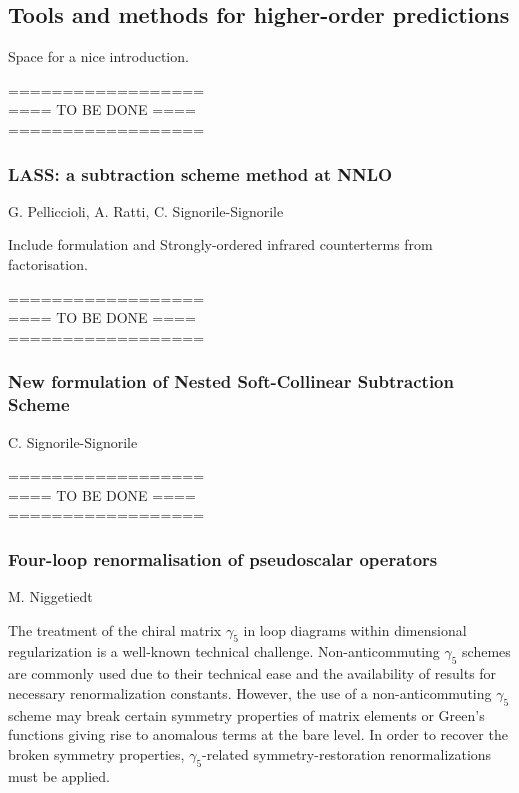 \documentclass{FBR_Bericht_2025}
\begin{document}
\subsection{Tools and methods for higher-order predictions}
\begin{refsection}
Space for a nice introduction.

%
{\color{red} ==================\\ ====\; TO BE DONE\; ====\\ ==================}
%
\subsubsection{LASS: a subtraction scheme method at NNLO}
\begin{Namen}
G. Pelliccioli, A. Ratti, C. Signorile-Signorile
\end{Namen}
Include formulation and Strongly-ordered infrared counterterms from factorisation.

%
{\color{red} ==================\\ ====\; TO BE DONE\; ====\\ ==================}
%
\subsubsection{New formulation of Nested Soft-Collinear Subtraction Scheme}
\begin{Namen}
C. Signorile-Signorile
\end{Namen}
%
{\color{red} ==================\\ ====\; TO BE DONE\; ====\\ ==================}
%
\subsubsection{Four-loop renormalisation of pseudoscalar operators}
\begin{Namen}
M. Niggetiedt
\end{Namen}
%
The treatment of the chiral matrix $\gamma_5$ in loop diagrams within dimensional regularization is a well-known technical challenge. Non-anticommuting $\gamma_5$ schemes are commonly used due to their technical ease and the availability of results for necessary renormalization constants. However, the use of a non-anticommuting $\gamma_5$ scheme may break certain symmetry properties of matrix elements or Green's functions giving rise to anomalous terms at the bare level. In order to recover the broken symmetry properties, $\gamma_5$-related symmetry-restoration renormalizations must be applied. 


\end{refsection}
\end{document}
